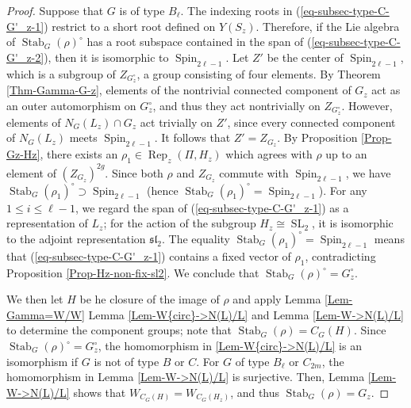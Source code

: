 \documentclass[11pt,oneside,dvipsnames]{amsart}
\theoremstyle{plain}
\theoremstyle{definition}
\theoremstyle{named}
\DeclareMathOperator{\Rep}{Rep}
\DeclareMathOperator{\SL}{SL}
\DeclareMathOperator{\Spin}{Spin}
\DeclareMathOperator{\Stab}{Stab}
\begin{document}
\begin{proof}
Suppose that $G$ is of type $B_{\ell}$. The indexing roots in (\ref{eq-subsec-type-C-G'_z-1}) restrict to a short root defined on $Y(S_z)$. Therefore, if the Lie algebra of $\Stab_G(\rho)^{\circ}$ has a root subspace contained in the span of (\ref{eq-subsec-type-C-G'_z-2}), then it is isomorphic to $\Spin_{2\ell-1}$. Let $Z'$ be the center of $\Spin_{2\ell-1}$, which is a subgroup of $Z_{G^{\circ}_z}$, a group consisting of four elements. By Theorem \ref{Thm-Gamma-G-z}, elements of the nontrivial connected component of $G_z$ act as an outer automorphism on $G_z^{\circ}$, and thus they act nontrivially on $Z_{G_z^{\circ}}$. However, elements of $N_G(L_z)\cap G_z$ act trivially on $Z'$, since every connected component of $N_G(L_z)$ meets $\Spin_{2\ell-1}$. It follows that $Z'=Z_{G_z}$. By Proposition \ref{Prop-Gz-Hz}, there exists an $\rho_1\in\Rep_z(\Pi,H_z)$ which agrees with $\rho$ up to an element of $(Z_{G_z})^{2g}$. Since both $\rho$ and $Z_{G_z}$ commute with $\Spin_{2\ell-1}$, we  have $\Stab_G(\rho_1)^{\circ}\supset\Spin_{2\ell-1}$ (hence $\Stab_G(\rho_1)^{\circ}=\Spin_{2\ell-1}$). For any $1\le i\le \ell-1$, we regard the span of (\ref{eq-subsec-type-C-G'_z-1}) as a representation of $L_z$; for the action of the subgroup $H_z\cong\SL_2$, it is isomorphic to the adjoint representation $\mathfrak{sl}_2$. The equality $\Stab_G(\rho_1)^{\circ}=\Spin_{2\ell-1}$ means that (\ref{eq-subsec-type-C-G'_z-1}) contains a fixed vector of $\rho_1$, contradicting Proposition \ref{Prop-Hz-non-fix-sl2}. We conclude that $\Stab_G(\rho)^{\circ}=G_z^{\circ}$.

We then let $H$ be he closure of the image of $\rho$ and apply Lemma \ref{Lem-Gamma=W/W} Lemma \ref{Lem-W{circ}->N(L)/L} and Lemma \ref{Lem-W->N(L)/L} to determine the component groups; note that $\Stab_G(\rho)=C_G(H)$. Since $\Stab_G(\rho)^{\circ}=G_z^{\circ}$, the homomorphism in \ref{Lem-W{circ}->N(L)/L} is an isomorphism if $G$ is not of type $B$ or $C$. For $G$ of type $B_{\ell}$ or $C_{2m}$, the homomorphism in Lemma \ref{Lem-W->N(L)/L} is surjective. Then, Lemma \ref{Lem-W->N(L)/L} shows that $W_{C_G(H)}=W_{C_G(H_z)}$, and thus $\Stab_G(\rho)=G_z$. 
\end{proof}
\end{document}
